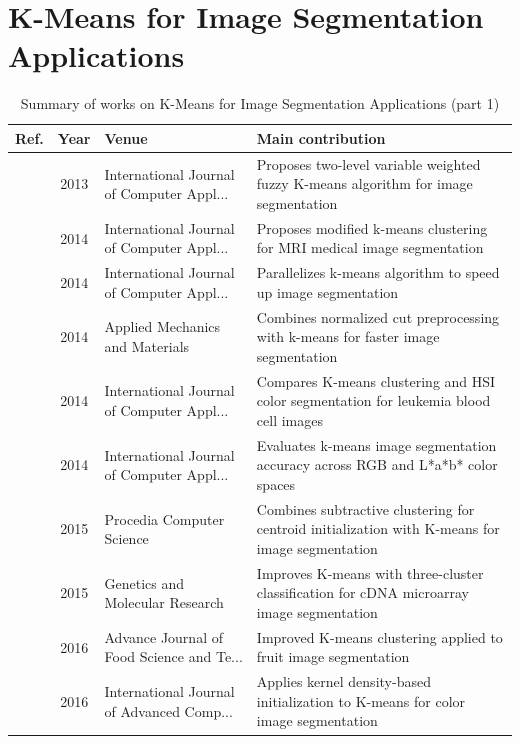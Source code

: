 \section{K-Means for Image Segmentation Applications}\label{sec:theme0}
\begin{table}[!t]
\centering
\renewcommand{\arraystretch}{1.2}
\caption{Summary of works on K-Means for Image Segmentation Applications (part 1)}\label{tab:theme0}
\begin{tabularx}{\textwidth}{@{}l c p{3.6cm} X@{}}
\toprule
\textbf{Ref.} & \textbf{Year} & \textbf{Venue} & \textbf{Main contribution} \\
\midrule
\cite{suganya2013image} & 2013 & International Journal of Computer Appl... & Proposes two-level variable weighted fuzzy K-means algorithm for image segmentation \\
\cite{shrivastava2014medical} & 2014 & International Journal of Computer Appl... & Proposes modified k-means clustering for MRI medical image segmentation \\
\cite{lopez2014parallelization} & 2014 & International Journal of Computer Appl... & Parallelizes k-means algorithm to speed up image segmentation \\
\cite{yu2014improved} & 2014 & Applied Mechanics and Materials & Combines normalized cut preprocessing with k-means for faster image segmentation \\
\cite{fatma2014leukemia} & 2014 & International Journal of Computer Appl... & Compares K-means clustering and HSI color segmentation for leukemia blood cell images \\
\cite{maqilburney2014means} & 2014 & International Journal of Computer Appl... & Evaluates k-means image segmentation accuracy across RGB and L*a*b* color spaces \\
\cite{dhanachandra2015image} & 2015 & Procedia Computer Science & Combines subtractive clustering for centroid initialization with K-means for image segmentation \\
\cite{wang2015improved} & 2015 & Genetics and Molecular Research & Improves K-means with three-cluster classification for cDNA microarray image segmentation \\
\cite{wang2016method} & 2016 & Advance Journal of Food Science and Te... & Improved K-means clustering applied to fruit image segmentation \\
\cite{kumar2016color} & 2016 & International Journal of Advanced Comp... & Applies kernel density-based initialization to K-means for color image segmentation \\

\end{tabularx}
\end{table}
